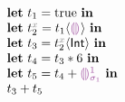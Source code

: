 


  \[\begin{array}{l}
    \ELet{t_1}{\ETrue} \EIn \\
    \ELet{\EVarNamed{2}{x}}{\ECast{t_1}{\THole}} \EIn \\
    \ELet{t_3}{\ECast{\EVarNamed{2}{x}}{\TInt}} \EIn \\
    \ELet{t_4}{\ETimes{t_3}{6}} \EIn \\
    \ELet{t_5}{\EPlus{t_4}{\EEHole{1}}} \EIn \\
    \EPlus{t_3}{t_5}
  \end{array}\]

